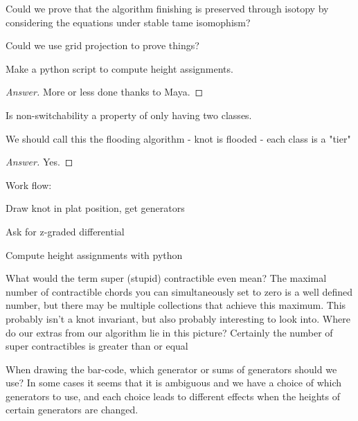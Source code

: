 \documentclass[General-Information/editedlog.tex]{subfiles}
\begin{document}
\begin{question}
Could we prove that the algorithm finishing is preserved through isotopy by considering the equations under stable tame isomophism?
\end{question}

\begin{question}
Could we use grid projection to prove things?
\end{question}

\begin{question}
Make a python script to compute height assignments.
\end{question}
\begin{proof}[Answer]
    More or less done thanks to Maya.
\end{proof}

\begin{question}
Is non-switchability a property of only having two classes.
\end{question}

\begin{question}
We should call this the flooding algorithm - knot is flooded  - each class is a "tier" 
\end{question}
\begin{proof}[Answer]
    Yes.
\end{proof}

\begin{question}

Work flow:



Draw knot in plat position, get generators

Ask for z-graded differential

Compute height assignments with python

\end{question}

\begin{question}
    What would the term super (stupid) contractible even mean? The maximal number of contractible chords you can simultaneously set to zero is a well defined number, but there may be multiple collections that achieve this maximum. This probably isn't a knot invariant, but also probably interesting to look into. Where do our extras from our algorithm lie in this picture? Certainly the number of super contractibles is greater than or equal
\end{question}

\begin{question}
    When drawing the bar-code, which generator or sums of generators should we use? In some cases it seems that it is ambiguous and we have a choice of which generators to use, and each choice leads to different effects when the heights of certain generators are changed.
\end{question}
\end{document}

